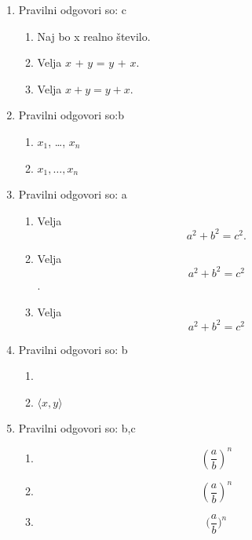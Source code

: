 \documentclass[11pt]{article}
\begin{document}
\begin{enumerate}
    \item Pravilni odgovori so: c%
    \begin{enumerate}
        \item Naj bo x realno število.
        \item Velja \(x\) + \(y\) = \(y\) + \(x\).
        \item Velja \(x + y = y + x\).
    \end{enumerate}

    \item Pravilni odgovori so:b %
    \begin{enumerate}
        \item \(x_1\), \dots, \(x_n\)
        \item \(x_1, \ldots, x_n\)
    \end{enumerate}

    \item Pravilni odgovori so: a%
    \begin{enumerate}
        \item
Velja
\[
  a^2 + b^2 = c^2.
\]
        \item
Velja
\[
  a^2 + b^2 = c^2
\]
.
        \item
Velja
\[
  a^2 + b^2 = c^2
\]
    \end{enumerate}

    \item Pravilni odgovori so: b%
    \begin{enumerate}
        \item \(<x, y>\)
        \item \(\langle x, y \rangle\)
    \end{enumerate}

    \item Pravilni odgovori so: b,c%
    \begin{enumerate}
        \item \[ (\frac{a}{b})^n \]
        \item \[ \left(\frac{a}{b}\right)^n \]
        \item \[ \Big(\frac{a}{b}\Big)^n \]
    \end{enumerate}


\end{enumerate}
\end{document}
